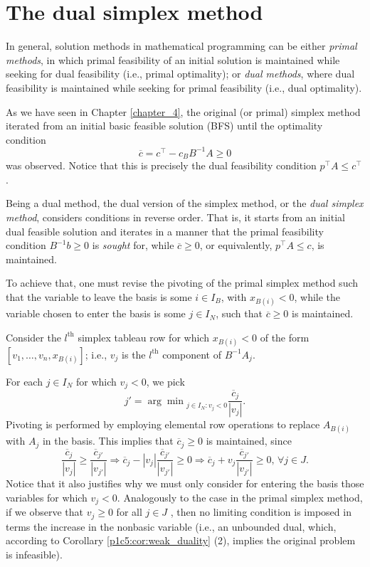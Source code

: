 \section{The dual simplex method}


In general, solution methods in mathematical programming can be either \emph{primal methods}, in which primal feasibility of an initial solution is maintained while seeking for dual feasibility (i.e., primal optimality); or \emph{dual methods}, where dual feasibility is maintained while seeking for primal feasibility (i.e., dual optimality).

As we have seen in Chapter \ref{chapter_4}, the original (or primal) simplex method iterated from an initial basic feasible solution (BFS) until the optimality condition 
%
\begin{equation*}
	\overline{c} = c^\top - c_BB^{-1}A \geq 0
\end{equation*}
%
was observed. Notice that this is precisely the dual feasibility condition $p^\top A \leq c^\top$. 

Being a dual method, the dual version of the simplex method, or the \emph{dual simplex method}, considers conditions in reverse order. That is, it starts from an initial dual feasible solution and iterates in a manner that the primal feasibility condition $B^{-1}b \geq 0$ is \emph{sought} for, while $\overline{c} \geq 0$, or equivalently, $p^\top A \leq c$, is maintained.

To achieve that, one must revise the pivoting of the primal simplex method such that the variable to leave the basis is some $i \in I_B$, with $x_{B(i)} < 0$, while the variable chosen to enter the basis is some $j \in I_N$, such that $\overline{c} \geq 0$ is maintained.

 Consider the $l^\text{th}$ simplex tableau row for which $x_{B(i)} < 0$ of the form $[v_1,\dots, v_n, x_{B(i)}]$; i.e., $v_j$ is the $l^\text{th}$ component of $B^{-1}A_j$.
	 
 For each $j \in I_N$ for which $v_j < 0$, we pick
 \begin{equation*}
 	j' = {\arg\min}_{j \in I_N : v_j < 0} \frac{\overline{c}_j}{|v_j|}.	
 \end{equation*}
 Pivoting is performed by employing elemental row operations to replace $A_{B(i)}$ with $A_j$ in the basis. This implies that $\overline{c}_j \geq 0$ is maintained, since
 \begin{equation*}
	\frac{\overline{c}_j}{|v_j|} \geq \frac{\overline{c}_{j'}}{|v_{j'}|} \Rightarrow \overline{c}_j -|v_j|\frac{\overline{c}_{j'}}{|v_{j'}|} \geq 0 \Rightarrow \overline{c}_j + v_j\frac{\overline{c}_{j'}}{|v_{j'}|} \geq 0, \, \forall j \in J.
 \end{equation*}
%
Notice that it also justifies why we must only consider for entering the basis those variables for which $v_j < 0$. Analogously to the case in the primal simplex method, if we observe that $v_j \ge 0$ for all $j \in J$ , then no limiting condition is imposed in terms the increase in the nonbasic variable (i.e., an unbounded dual, which, according to Corollary \ref{p1c5:cor:weak_duality} (2), implies the original problem is infeasible).

